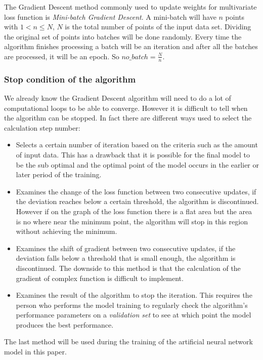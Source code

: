 \documentclass[conference]{IEEEtran}
\begin{document}
The Gradient Descent method commonly used to update weights for multivariate loss function is \emph{Mini-batch Gradient Descent}. A mini-batch will have $ n $ points with $ 1 <n {\leq} N $, $ N $ is the total number of points of the input data set. Dividing the original set of points into batches will be done randomly. Every time the algorithm finishes processing a batch will be an iteration and after all the batches are processed, it will be an epoch. So $ no\_batch = \frac {N} {n} $.

\subsubsection{Stop condition of the algorithm}
We already know the Gradient Descent algorithm will need to do a lot of computational loops to be able to converge. However it is difficult to tell when the algorithm can be stopped. In fact there are different ways used to select the calculation step number:
\begin{itemize}
	\item Selects a certain number of iteration based on the criteria such as the amount of input data. This has a drawback that it is possible for the final model to be the sub optimal and the optimal point of the model occurs in the earlier or later period of the training.
	\item Examines the change of the loss function between two consecutive updates, if the deviation reaches below a certain threshold, the algorithm is discontinued. However if on the graph of the loss function there is a flat area but the area is no where near the minimum point, the algorithm will stop in this region without achieving the minimum.
	\item Examines the shift of gradient between two consecutive updates, if the deviation falls below a threshold that is small enough, the algorithm is discontinued. The downside to this method is that the calculation of the gradient of complex function is difficult to implement.
	\item Examines the result of the algorithm to stop the iteration. This requires the person who performs the model training to regularly check the algorithm's performance parameters on a \emph{validation set} to see at which point the model produces the best performance.
\end{itemize}
The last method will be used during the training of the artificial neural network model in this paper.
\end{document}
